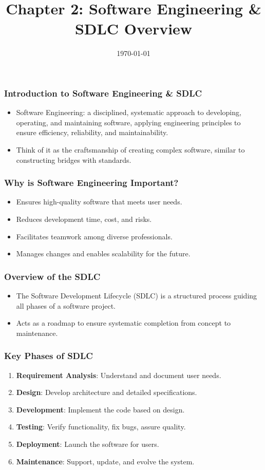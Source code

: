 \documentclass{beamer}
\title{Chapter 2: Software Engineering \& SDLC Overview}
\author{}
\institute{}
\date{\today}
\begin{document}
\frame{\titlepage}

\begin{frame}[fragile]
    \frametitle{Introduction to Software Engineering \& SDLC}
    \begin{itemize}
        \item Software Engineering: a disciplined, systematic approach to developing, operating, and maintaining software, applying engineering principles to ensure efficiency, reliability, and maintainability.
        \item Think of it as the craftsmanship of creating complex software, similar to constructing bridges with standards.
    \end{itemize}
\end{frame}

\begin{frame}[fragile]
    \frametitle{Why is Software Engineering Important?}
    \begin{itemize}
        \item Ensures high-quality software that meets user needs.
        \item Reduces development time, cost, and risks.
        \item Facilitates teamwork among diverse professionals.
        \item Manages changes and enables scalability for the future.
    \end{itemize}
\end{frame}

\begin{frame}[fragile]
    \frametitle{Overview of the SDLC}
    \begin{itemize}
        \item The Software Development Lifecycle (SDLC) is a structured process guiding all phases of a software project.
        \item Acts as a roadmap to ensure systematic completion from concept to maintenance.
    \end{itemize}
\end{frame}

\begin{frame}[fragile]
    \frametitle{Key Phases of SDLC}
    \begin{enumerate}
        \item \textbf{Requirement Analysis}: Understand and document user needs.
        \item \textbf{Design}: Develop architecture and detailed specifications.
        \item \textbf{Development}: Implement the code based on design.
        \item \textbf{Testing}: Verify functionality, fix bugs, assure quality.
        \item \textbf{Deployment}: Launch the software for users.
        \item \textbf{Maintenance}: Support, update, and evolve the system.
    \end{enumerate}
\end{frame}
\end{document}
